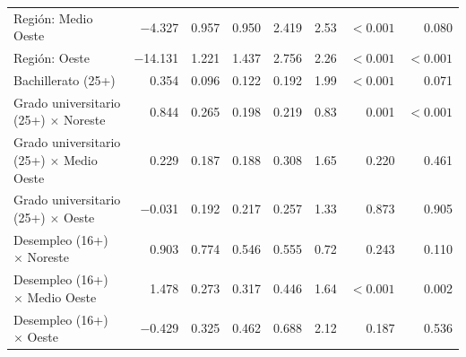 {\begin{xltabular}{\linewidth}{>{\raggedright\arraybackslash}X r r r r r r r}
Región: Medio Oeste & \num{-4.327} & \num{0.957} & \num{0.950} & \num{2.419} & \num{2.53} & $<\num{0.001}$ & \num{0.080} \\
Región: Oeste & \num{-14.131} & \num{1.221} & \num{1.437} & \num{2.756} & \num{2.26} & $<\num{0.001}$ & $<\num{0.001}$ \\
Bachillerato (25+) & \num{0.354} & \num{0.096} & \num{0.122} & \num{0.192} & \num{1.99} & $<\num{0.001}$ & \num{0.071} \\
Grado universitario (25+) $\times$ Noreste & \num{0.844} & \num{0.265} & \num{0.198} & \num{0.219} & \num{0.83} & \num{0.001} & $<\num{0.001}$ \\
Grado universitario (25+) $\times$ Medio Oeste & \num{0.229} & \num{0.187} & \num{0.188} & \num{0.308} & \num{1.65} & \num{0.220} & \num{0.461} \\
Grado universitario (25+) $\times$ Oeste & \num{-0.031} & \num{0.192} & \num{0.217} & \num{0.257} & \num{1.33} & \num{0.873} & \num{0.905} \\
Desempleo (16+) $\times$ Noreste & \num{0.903} & \num{0.774} & \num{0.546} & \num{0.555} & \num{0.72} & \num{0.243} & \num{0.110} \\
Desempleo (16+) $\times$ Medio Oeste & \num{1.478} & \num{0.273} & \num{0.317} & \num{0.446} & \num{1.64} & $<\num{0.001}$ & \num{0.002} \\
Desempleo (16+) $\times$ Oeste & \num{-0.429} & \num{0.325} & \num{0.462} & \num{0.688} & \num{2.12} & \num{0.187} & \num{0.536} \\
\end{xltabular}
}
